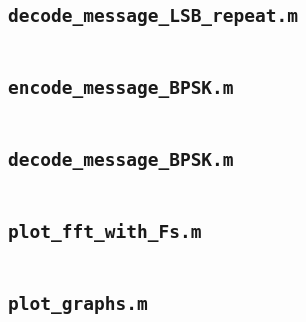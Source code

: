 \documentclass{article}
\begin{document}
\subsection{\texttt{decode\_message\_LSB\_repeat.m}}
\inputminted[xleftmargin=24pt, linenos=true, breaklines]{matlab}{src/decode_message_LSB_repeat.m}

\subsection{\texttt{encode\_message\_BPSK.m}}
\inputminted[xleftmargin=24pt, linenos=true, breaklines]{matlab}{src/encode_message_BPSK.m}

\subsection{\texttt{decode\_message\_BPSK.m}}
\inputminted[xleftmargin=24pt, linenos=true, breaklines]{matlab}{src/decode_message_BPSK.m}

\subsection{\texttt{plot\_fft\_with\_Fs.m}}
\inputminted[xleftmargin=24pt, linenos=true, breaklines]{matlab}{src/plot_fft_with_Fs.m}

\subsection{\texttt{plot\_graphs.m}}
\inputminted[xleftmargin=24pt, linenos=true, breaklines]{matlab}{plot_graphs.m}
\end{document}

